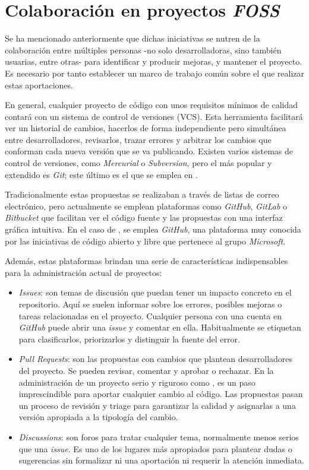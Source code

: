 \section{Colaboración en proyectos \textit{FOSS}} \label{sct:colaboracion_FOSS}

Se ha mencionado anteriormente que dichas iniciativas se nutren de la colaboración entre múltiples personas -no solo desarrolladoras, sino también usuarias, entre otras- para identificar y producir mejoras, y mantener el proyecto. Es necesario por tanto establecer un marco de trabajo común sobre el que realizar estas aportaciones.

En general, cualquier proyecto de código con unos requisitos mínimos de calidad contará con un sistema de control de versiones (\gls{VCS}). Esta herramienta facilitará ver un historial de cambios, hacerlos de forma independiente pero simultánea entre desarrolladores, revisarlos, trazar errores y arbitrar los cambios que conforman cada nueva versión que se va publicando. Existen varios sistemas de control de versiones, como \textit{Mercurial} o \textit{Subversion}, pero el más popular y extendido es \textit{Git}; este último es el que se emplea en \pvlibpy{}.

Tradicionalmente estas propuestas se realizaban a través de listas de correo electrónico, pero actualmente se emplean plataformas como \textit{GitHub}, \textit{GitLab} o \textit{Bitbucket} que facilitan ver el código fuente y las propuestas con una \gls{interfaz gráfica} intuitiva. En el caso de \pvlibpy{}, se emplea \textit{GitHub}, una plataforma muy conocida por las iniciativas de código abierto y libre que pertenece al grupo \textit{Microsoft}.

Además, estas plataformas brindan una serie de características indispensables para la administración actual de proyectos:

\begin{itemize}
    \item \textit{Issues}: son temas de discusión que puedan tener un impacto concreto en el \gls{repositorio}. Aquí se suelen informar sobre los errores, posibles mejoras o tareas relacionadas en el proyecto. Cualquier persona con una cuenta en \textit{GitHub} puede abrir una \textit{\gls{issue}} y comentar en ella. Habitualmente se etiquetan para clasificarlos, priorizarlos y distinguir la fuente del error.
    \item \textit{Pull Requests}: son las propuestas con cambios que plantean desarrolladores del proyecto. Se pueden revisar, comentar y aprobar o rechazar. En la administración de un proyecto serio y riguroso como \pvlibpy{}, es un paso imprescindible para aportar cualquier cambio al código. Las propuestas pasan un proceso de revisión y triage para garantizar la calidad y asignarlas a una versión apropiada a la tipología del cambio.
    \item \textit{Discussions}: son foros para tratar cualquier tema, normalmente menos serios que una \textit{\gls{issue}}. Es uno de los lugares más apropiados para plantear dudas o sugerencias sin formalizar ni una aportación ni requerir la atención inmediata.
\end{itemize}

